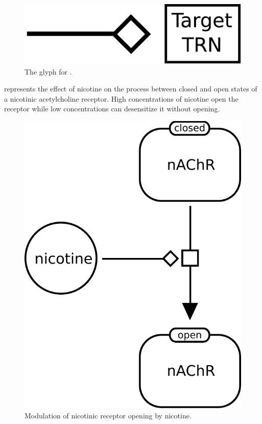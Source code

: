 \begin{figure}[H]
  \centering
  \includegraphics[scale = 0.5]{images/modulation}
  \caption{The \PD glyph for .}
  \label{fig:modulation}
\end{figure}

 represents the effect of nicotine on the process between closed and open states of a nicotinic acetylcholine receptor. High concentrations of nicotine open the receptor while low concentrations can desensitize it without opening. 

\begin{figure}[H]
  \centering
  \includegraphics[scale = 0.5]{examples/modulation-nAChR}
  \caption{Modulation of nicotinic receptor opening by nicotine.}
  \label{fig:modul-nico}
\end{figure}



